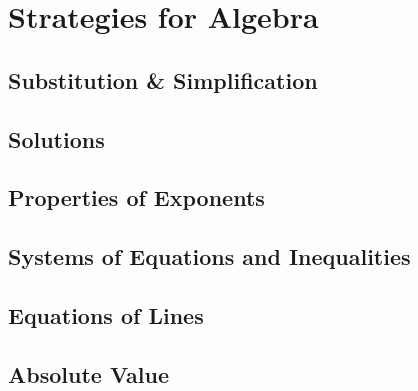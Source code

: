\chapter{Strategies for Algebra}

\section{Substitution \& Simplification}
\section{Solutions}
\section{Properties of Exponents}
\section{Systems of Equations and Inequalities}
\section{Equations of Lines}
\section{Absolute Value}